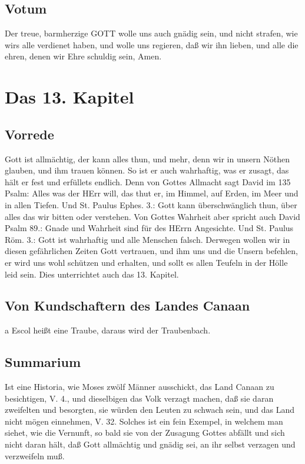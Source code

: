 \section{Votum}

Der treue, barmherzige GOTT wolle uns auch gnädig sein, und nicht strafen, wie wirs alle verdienet haben, und wolle uns regieren, daß wir ihn lieben, und alle die ehren, denen wir Ehre schuldig sein, Amen.

\chapter{Das 13. Kapitel}

\section{Vorrede}

Gott ist allmächtig, der kann alles thun, und mehr, denn wir in unsern Nöthen glauben, und
ihm trauen können. So ist er auch wahrhaftig, was er zusagt, das hält er fest und erfüllets endlich. Denn von Gottes Allmacht sagt David im 135 Psalm: Alles was der HErr will, das thut er, im Himmel, auf Erden, im Meer und in allen Tiefen. Und St. Paulus Ephes. 3.: Gott kann überschwänglich thun, über alles das wir bitten oder verstehen. Von Gottes Wahrheit aber spricht auch David Psalm 89.: Gnade und Wahrheit sind für des HErrn Angesichte. Und St. Paulus Röm. 3.: Gott ist wahrhaftig und alle Menschen falsch. Derwegen wollen wir in diesen gefährlichen Zeiten Gott vertrauen, und ihm uns und die Unsern befehlen, er wird uns wohl schützen und erhalten, und sollt es allen Teufeln in der Hölle leid sein. Dies unterrichtet auch das 13. Kapitel.

\section{Von Kundschaftern des Landes Canaan}

a Escol heißt eine Traube, daraus wird der Traubenbach.

\section{Summarium}

Ist eine Historia, wie Moses zwölf Männer ausschickt, das Land Canaan zu besichtigen, V. 4., und dieselbigen das Volk verzagt machen, daß sie daran zweifelten und besorgten, sie würden den Leuten zu schwach sein, und das Land nicht mögen einnehmen, V. 32. Solches ist ein fein Exempel, in welchem man siehet, wie die Vernunft, so bald sie von der Zusagung Gottes abfällt und sich nicht daran hält, daß Gott allmächtig und gnädig sei, an ihr selbst verzagen und verzweifeln muß.

